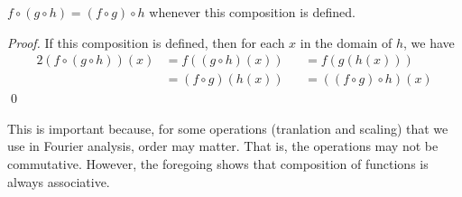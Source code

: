 \begin{theorem}
$f \circ (g \circ h) = (f \circ g) \circ h$ whenever this
composition is defined.
\end{theorem}
\begin{proof}
If this composition is defined, then for each $x$ in the domain of
$h$, we have
\begin{alignat*}{2}
(f \circ (g \circ h))(x) &=  f ((g \circ h)(x)) &&=  f (g (h(x)))\\
&=(f \circ g)(h(x)) &&= ((f \circ g) \circ h)(x)
\end{alignat*}
\qed
\end{proof}
\begin{remark} This is important because, for some operations
(\eg tranlation and scaling) that we use in Fourier analysis, order
may matter. That is, the operations may not be commutative.
However, the foregoing shows that composition of functions is always
associative.  
\end{remark}

